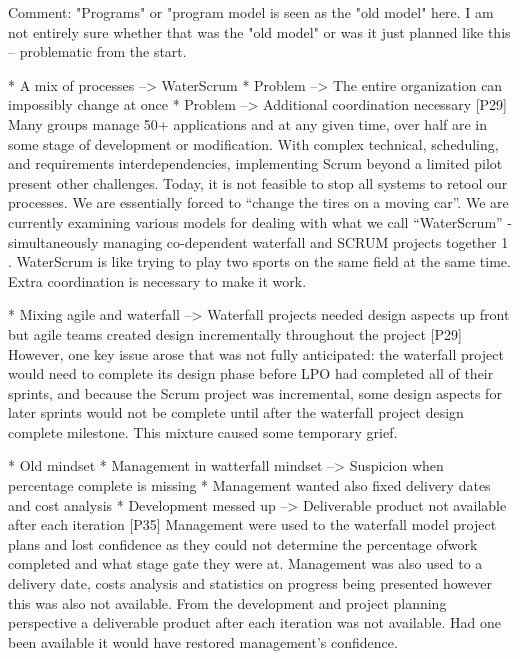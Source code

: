 \documentclass[preprint,authoryear,12pt]{elsarticle}
\begin{document}
Comment:
"Programs" or "program model is seen as the "old model" here. I am not entirely
sure whether that was the "old model" or was it just planned like this --
problematic from the start.


* A mix of processes --> WaterScrum
* Problem --> The entire organization can impossibly change at once
* Problem --> Additional coordination necessary
[P29]
Many groups manage 50+ applications and at any given time, over half are in some
stage of development or modification.  With complex technical, scheduling, and
requirements interdependencies, implementing Scrum beyond a limited pilot
present other challenges.  Today, it is not feasible to stop all systems to
retool our processes.  We are essentially forced to “change the tires on a
moving car”.
We are currently examining various models for dealing with what we call
“WaterScrum” - simultaneously managing co-dependent waterfall and SCRUM projects
together 1 .  WaterScrum is like trying to play two sports on the same field at
the same time.  Extra coordination is necessary to make it work.


* Mixing agile and waterfall --> Waterfall projects needed design aspects up front but agile teams created design incrementally throughout the project
[P29]
However, one key issue arose that was not fully anticipated: the waterfall
project would need to complete its design phase before LPO had completed all of
their sprints, and because the Scrum project was incremental, some design
aspects for later sprints would not be complete until after the waterfall
project design complete milestone.  This mixture caused some temporary grief.


* Old mindset
* Management in watterfall mindset --> Suspicion when percentage complete is missing
* Management wanted also fixed delivery dates and cost analysis
* Development messed up --> Deliverable product not available after each iteration
[P35]
Management were used to the waterfall model project plans and lost confidence as
they could not determine the percentage ofwork completed and what stage gate
they were at. Management was also used to a delivery date, costs analysis and
statistics on progress being presented however this was also not available. From
the development and project planning perspective a deliverable product after
each iteration was not available. Had one been available it would have restored
management’s confidence.
\end{document}
